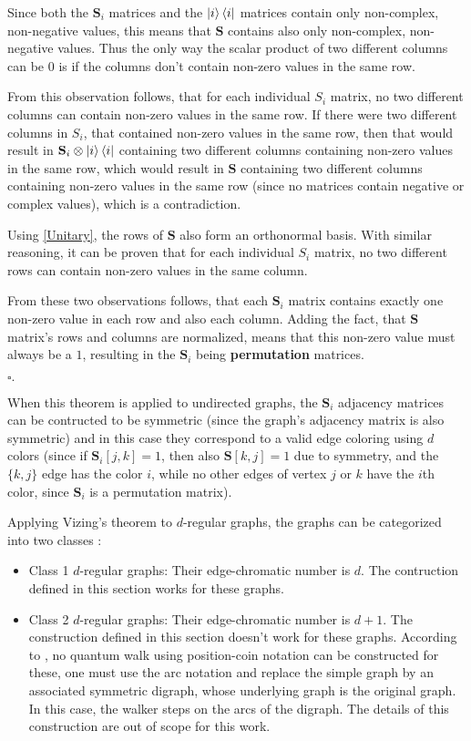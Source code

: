 Since both the $\mathbf{S}_i$ matrices and the $\ket{i}\bra{i}$ matrices contain only non-complex, non-negative values, this means that $\mathbf{S}$ contains also only non-complex, non-negative values. Thus the only way the scalar product of two different columns can be $0$ is if the columns don't contain non-zero values in the same row.

From this observation follows, that for each individual $S_i$ matrix, no two different columns can contain non-zero values in the same row. If there were two different columns in $S_i$, that contained non-zero values in the same row, then that would result in $\mathbf{S}_i \otimes \ket{i}\bra{i}$ containing two different columns containing non-zero values in the same row, which would result in $\mathbf{S}$ containing two different columns containing non-zero values in the same row (since no matrices contain negative or complex values), which is a contradiction.

Using \hyperref[Unitary]{[Unitary]}, the rows of $\mathbf{S}$ also form an orthonormal basis. With similar reasoning, it can be proven that for each individual $S_i$ matrix, no two different rows can contain non-zero values in the same column.

From these two observations follows, that each $\mathbf{S}_i$ matrix contains exactly one non-zero value in each row and also each column. Adding the fact, that $\mathbf{S}$ matrix's rows and columns are normalized, means that this non-zero value must always be a $1$, resulting in the $\mathbf{S}_i$ being \textbf{permutation} matrices.

\begin{flushright}
$\square{}.$
\end{flushright}

When this theorem is applied to undirected graphs, the $\mathbf{S}_i$ adjacency matrices can be contructed to be symmetric (since the graph's adjacency matrix is also symmetric) and in this case they correspond to a valid edge coloring using $d$ colors (since if $\mathbf{S}_i[j,k] = 1$, then also $\mathbf{S}[k,j] = 1$ due to symmetry, and the $\{k,j\}$ edge has the color $i$, while no other edges of vertex $j$ or $k$ have the $i$th color, since $\mathbf{S}_i$ is a permutation matrix).

Applying Vizing's theorem to $d$-regular graphs, the graphs can be categorized into two classes \cite{Portugal}:
\begin{itemize}
\item Class 1 $d$-regular graphs: Their edge-chromatic number is $d$. The contruction defined in this section works for these graphs.
\item Class 2 $d$-regular graphs: Their edge-chromatic number is $d+1$. The construction defined in this section doesn't work for these graphs. According to \cite{Portugal}, no quantum walk using position-coin notation can be constructed for these, one must use the arc notation and replace the simple graph by an associated symmetric digraph, whose underlying graph is the original graph. In this case, the walker steps on the arcs of the digraph. The details of this construction are out of scope for this work.
\end{itemize}